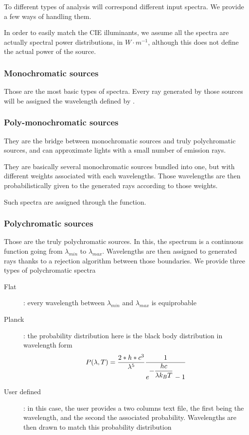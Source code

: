 To different types of analysis will correspond different input spectra. We provide a few ways of handling them.

In order to easily match the CIE illuminants, we assume all the spectra are actually spectral power distributions, in $W\cdot m^{-1}$, although this does not define the actual power of the source.

\subsubsection{Monochromatic sources}

Those are the most basic types of spectra. Every ray generated by those sources will be assigned the wavelength defined by .

\subsubsection{Poly-monochromatic sources}

They are the bridge between monochromatic sources and truly polychromatic sources, and can approximate lights with a small number of emission rays.

They are basically several monochromatic sources bundled into one, but with different weights associated with each wavelengths. Those wavelengths are then probabilistically given to the generated rays according to those weights.

Such spectra are assigned through the  function.

\subsubsection{Polychromatic sources}

Those are the truly polychromatic sources. In this, the spectrum is a continuous function going from $\lambda_{min}$ to $\lambda_{max}$. Wavelengths are then assigned to generated rays thanks to a rejection algorithm between those boundaries. We provide three types of polychromatic spectra
\begin{description}
	\item[Flat]: every wavelength between $\lambda_{min}$ and $\lambda_{max}$ is equiprobable
	\item[Planck]: the probability distribution here is the black body distribution in wavelength form
	\begin{equation}
		P(\lambda,T)=\frac{2*h*c^3}{\lambda^5}\frac{1}{e^{\displaystyle -\frac{hc}{\lambda k_B T}}-1}
	\end{equation}
	\item[User defined]: in this case, the user provides a two columns text file, the first being the wavelength, and the second the associated probability. Wavelengths are then drawn to match this probability distribution
\end{description}

